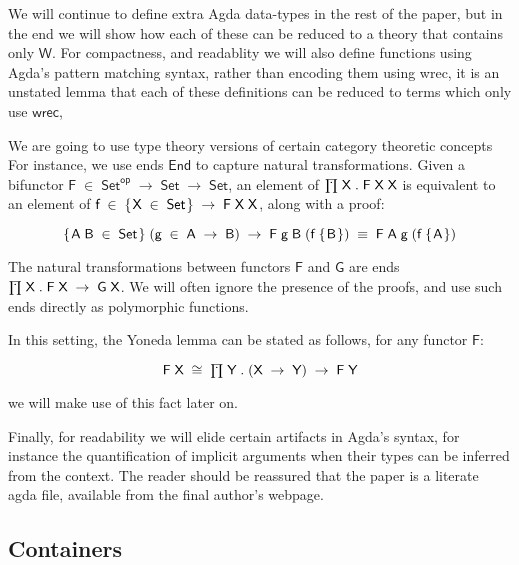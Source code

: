\documentclass[a4paper]{article}
\newcommand{\Conid}[1]{\mathit{#1}}
\newcommand{\Varid}[1]{\mathit{#1}}
\renewcommand\Varid[1]{\mathord{\textsf{#1}}}
\let\Conid\Varid
\begin{document}
\noindent
We will continue to define extra Agda data-types in the rest of the paper, but in the end we will show how each of these can be reduced to a theory that contains only \ensuremath{\Conid{W}}. For compactness, and readablity we will also define functions using Agda's pattern matching syntax, rather than encoding them using wrec, it is an unstated lemma that each of these definitions can be reduced to terms which only use \ensuremath{\Varid{wrec}},

We are going to use type theory versions of certain category theoretic concepts 
For instance, we use ends \ensuremath{\Conid{End}} to capture natural transformations.
Given a bifunctor \ensuremath{\Conid{F}\;\in\;\Conid{Set}^{\Varid{op}}\;\rightarrow\;\Conid{Set}\;\rightarrow\;\Conid{Set}}, an element of \ensuremath{\prodd\;\Conid{X}\;.\;\Conid{F}\;\Conid{X}\;\Conid{X}} is
equivalent to an element of \ensuremath{\Varid{f}\;\in\;\{\mskip1.5mu \Conid{X}\;\in\;\Conid{Set}\mskip1.5mu\}\;\rightarrow\;\Conid{F}\;\Conid{X}\;\Conid{X}}, along with a proof:

\[ \mbox{\ensuremath{\{\mskip1.5mu \Conid{A}\;\Conid{B}\;\in\;\Conid{Set}\mskip1.5mu\}\;(\Varid{g}\;\in\;\Conid{A}\;\rightarrow\;\Conid{B})\;\rightarrow\;\Conid{F}\;\Varid{g}\;\Conid{B}\;(\Varid{f}\;\{\mskip1.5mu \Conid{B}\mskip1.5mu\})\;\equiv\;\Conid{F}\;\Conid{A}\;\Varid{g}\;(\Varid{f}\;\{\mskip1.5mu \Conid{A}\mskip1.5mu\})}} \]


\noindent
The natural transformations between functors \ensuremath{\Conid{F}} and \ensuremath{\Conid{G}} are
ends \ensuremath{\prodd\;\Conid{X}\;.\;\Conid{F}\;\Conid{X}\;\rightarrow\;\Conid{G}\;\Conid{X}}. We will often ignore the presence of the proofs, and 
use such ends directly as polymorphic functions.

In this setting, the Yoneda lemma can be stated as follows, for any functor \ensuremath{\Conid{F}}:

\[\mbox{\ensuremath{\Conid{F}\;\Conid{X}\;\cong\;\prodd\;\Conid{Y}\;.\;(\Conid{X}\;\rightarrow\;\Conid{Y})\;\rightarrow\;\Conid{F}\;\Conid{Y}}}\]

we will make use of this fact later on.

Finally, for readability we will elide certain artifacts in Agda's syntax, for instance the quantification of implicit arguments when their types can be inferred from the context. The reader should be reassured that the paper is a literate agda file, available from the final author's webpage.
 
\subsection{Containers}
\end{document}
